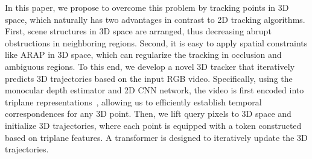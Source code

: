 In this paper, we propose to overcome this problem by tracking points in 3D space, which naturally has two advantages in contrast to 2D tracking algorithms.
First, scene structures in 3D space are  arranged, thus decreasing abrupt obstructions in neighboring regions.
Second, it is easy to apply spatial constraints like ARAP in 3D space, which can regularize the tracking in occlusion and ambiguous regions.
To this end, we develop a novel 3D tracker that iteratively predicts 3D trajectories based on the input RGB video.
Specifically, using the monocular depth estimator and 2D CNN network, the video is first encoded into triplane representations~\tocite{}, allowing us to efficiently establish temporal correspondences for any 3D point.
Then, we lift query pixels to 3D space and initialize 3D trajectories, where each point is equipped with a token constructed based on triplane features.
A transformer is designed to iteratively update the 3D trajectories.



